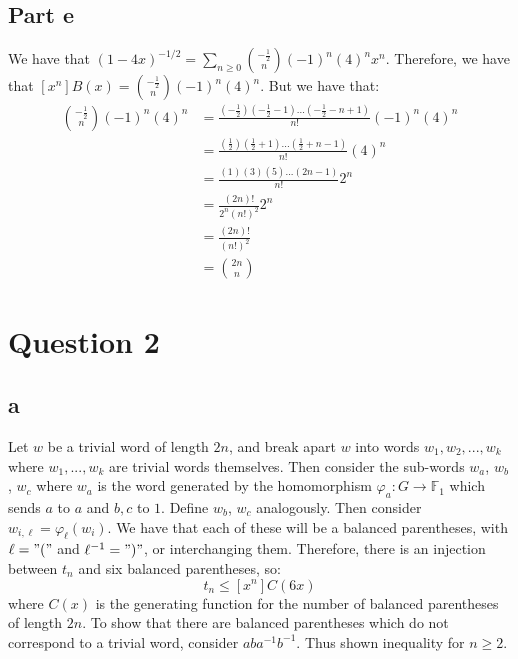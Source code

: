 \documentclass[]{article}
\begin{document}
\subsection{Part e}
We have that $(1-4x)^{-1/2} =\sum_{n \geq 0} \binom{-\frac{1}{2}}{n}(-1)^n (4)^n x^n$. Therefore, we have that $[x^n] B(x) = \binom{-\frac{1}{2}}{n}(-1)^n (4)^n$. But we have that:
\begin{align*}
	\binom{-\frac{1}{2}}{n}(-1)^n (4)^n &= \frac{(-\frac{1}{2})(-\frac{1}{2} - 1) ... (-\frac{1}{2} - n + 1)}{n!} (-1)^n (4)^n\\
	&= \frac{(\frac{1}{2})(\frac{1}{2} + 1) ... (\frac{1}{2} + n - 1)}{n!}(4)^n\\
	&= \frac{(1)(3)(5) ... (2n-1)}{n!} 2^n\\
	&= \frac{(2n)!}{2^n (n!)^2}2^n\\
	&= \frac{(2n)!}{(n!)^2}\\
	&= \binom{2n}{n}
\end{align*}
\newpage
\section{Question 2}
\subsection*{a}
Let $w$ be a trivial word of length $2n$, and break apart $w$ into words $w_1, w_2, ... , w_k$ where $w_1, ..., w_k$ are trivial words themselves. Then consider the sub-words $w_a$, $w_b$, $w_c$ where $w_a$ is the word generated by the homomorphism $\varphi_a: G \rightarrow \mathbb{F}_1$ which sends $a$ to $a$ and $b, c$ to $1$. Define $w_b$, $w_c$ analogously. Then consider $w_{i, \ell} = \varphi_\ell(w_i)$. We have that each of these will be a balanced parentheses, with $\ell = "("$ and $\ell^{-1} = ")"$, or interchanging them. Therefore, there is an injection between $t_n$ and six balanced parentheses, so:
\begin{equation}
	t_n \leq [x^n]C(6x)
\end{equation}
where $C(x)$ is the generating function for the number of balanced parentheses of length $2n$. 
To show that there are balanced parentheses which do not correspond to a trivial word, consider $aba^{-1}b^{-1}$. Thus shown inequality for $n \geq 2$. 
\end{document}
